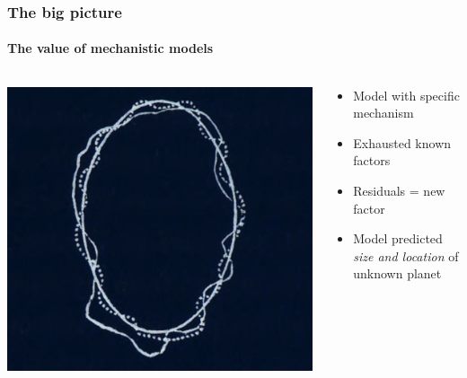 {
\DarkMode
\begin{frame}
    \frametitle{The big picture}
    \framesubtitle{The value of mechanistic models}
    \begin{columns}
        \begin{column}{0.5\textwidth}
        \includegraphics[width=\textwidth]{figures/Orbit2_Wellcome-inv.png}

        \end{column}
        \begin{column}{0.5\textwidth}
        \begin{itemize}
            \item Model with specific mechanism
            \item Exhausted known factors
            \item Residuals = new factor
            \item Model predicted \emph{size and location} of unknown planet
        \end{itemize}
        \end{column}
    \end{columns}
\end{frame}
}

